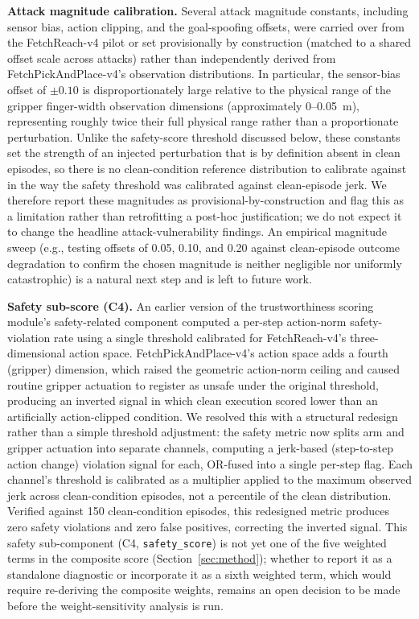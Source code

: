 \documentclass[conference]{IEEEtran}
\begin{document}
\textbf{Attack magnitude calibration.}
Several attack magnitude constants, including sensor bias, action clipping, and the
goal-spoofing offsets, were carried over from the FetchReach-v4 pilot or set
provisionally by construction (matched to a shared offset scale across attacks) rather
than independently derived from FetchPickAndPlace-v4's observation distributions. In
particular, the sensor-bias offset of $\pm 0.10$ is disproportionately large relative to
the physical range of the gripper finger-width observation dimensions (approximately
0--0.05~m), representing roughly twice their full physical range rather than a
proportionate perturbation. Unlike the safety-score threshold discussed below, these
constants set the strength of an injected perturbation that is by definition absent in
clean episodes, so there is no clean-condition reference distribution to calibrate
against in the way the safety threshold was calibrated against clean-episode jerk. We
therefore report these magnitudes as provisional-by-construction and flag this as a
limitation rather than retrofitting a post-hoc justification; we do not expect it to
change the headline attack-vulnerability findings. An empirical magnitude sweep (e.g.,
testing offsets of 0.05, 0.10, and 0.20 against clean-episode outcome degradation to
confirm the chosen magnitude is neither negligible nor uniformly catastrophic) is a
natural next step and is left to future work.

\textbf{Safety sub-score (C4).}
An earlier version of the trustworthiness scoring module's safety-related component
computed a per-step action-norm safety-violation rate using a single threshold
calibrated for FetchReach-v4's three-dimensional action space. FetchPickAndPlace-v4's
action space adds a fourth (gripper) dimension, which raised the geometric action-norm
ceiling and caused routine gripper actuation to register as unsafe under the original
threshold, producing an inverted signal in which clean execution scored lower than an
artificially action-clipped condition. We resolved this with a structural redesign
rather than a simple threshold adjustment: the safety metric now splits arm and gripper
actuation into separate channels, computing a jerk-based (step-to-step action change)
violation signal for each, OR-fused into a single per-step flag. Each channel's
threshold is calibrated as a multiplier applied to the maximum observed jerk across
clean-condition episodes, not a percentile of the clean distribution. Verified against
150 clean-condition episodes, this redesigned metric produces zero safety violations
and zero false positives, correcting the inverted signal. This safety sub-component
(C4, \texttt{safety\_score}) is not yet one of the five weighted terms in the composite
score (Section~\ref{sec:method}); whether to report it as a standalone diagnostic or
incorporate it as a sixth weighted term, which would require re-deriving the composite
weights, remains an open decision to be made before the weight-sensitivity analysis is
run.
\end{document}
